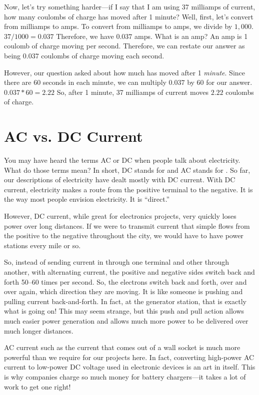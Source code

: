 \begin{exampleprob}
Now, let's try something harder---if I say that I am using 37 milliamps of current, how many coulombs of charge has moved after 1 minute?
Well, first, let's convert from milliamps to amps.  
To convert from milliamps to amps, we divide by $1,000$.
$37 / 1000 = 0.037$
Therefore, we have $0.037$ amps.
What is an amp?
An amp is 1 coulomb of charge moving per second.
Therefore, we can restate our answer as being $0.037$ coulombs of charge moving each second.

However, our question asked about how much has moved after 1 \emph{minute}.
Since there are $60$ seconds in each minute, we can multiply $0.037$ by $60$ for our answer.
$0.037 * 60 = 2.22$
So, after 1 minute, 37 milliamps of current moves $2.22$ coulombs of charge.
\end{exampleprob}

\section{AC vs. DC Current}

You may have heard the terms AC or DC when people talk about electricity.
What do those terms mean?
In short, DC stands for  and AC stands for .
So far, our descriptions of electricity have dealt mostly with DC current.
With DC current, electricity makes a route from the positive terminal to the negative.
It is the way most people envision electricity.
It is ``direct.''

However, DC current, while great for electronics projects, very quickly loses power over long distances.
If we were to transmit current that simple flows from the positive to the negative throughout the city, we would have to have power stations every mile or so.

So, instead of sending current in through one terminal and other through another, with alternating current, the positive and negative sides switch back and forth 50--60 times per second.
So, the electrons switch back and forth, over and over again, which direction they are moving.
It is like someone is pushing and pulling current back-and-forth.
In fact, at the generator station, that is exactly what is going on!
This may seem strange, but this push and pull action allows much easier power generation and allows much more power to be delivered over much longer distances.

AC current such as the current that comes out of a wall socket is much more powerful than we require for our projects here.
In fact, converting high-power AC current to low-power DC voltage used in electronic devices is an art in itself.
This is why companies charge so much money for battery chargers---it takes a lot of work to get one right!

